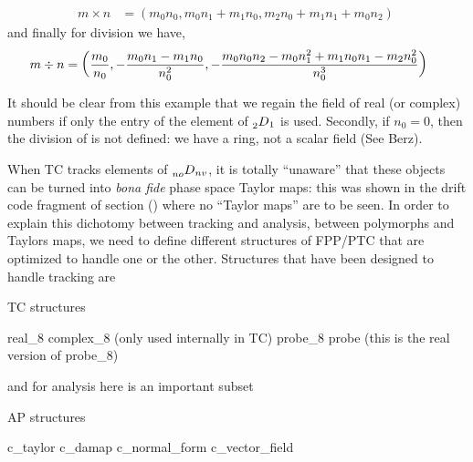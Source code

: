 \documentclass{hitec}     %
\begin{document}
{{{%
\begin{align}m\times n&=\left({{m}_{0}{n}_{0},{m}_{0}{n}_{1}+{m}_{1}{n}_{0},{m}_{2}{n}_{0}+{m}_{1}{n}_{1}+{m}_{0}{n}_{2}}\right)\ \label{eq:nodnvpmul}\end{align}
and finally for division we have,
%
\begin{align}m\div n&=\left({{{m}_{0} \over {n}_{0}},-{{m}_{0}{n}_{1}-{m}_{1}{n}_{0} \over {n}_{0}^{2}},-{{m}_{0}{n}_{0}{n}_{2}-{m}_{0}{n}_{1}^{2}+{m}_{1}{n}_{0}{n}_{1}-{m}_{2}{n}_{0}^{2} \over {n}_{0}^{3}}}\right)\ \label{eq:nodnvpdiv}\end{align}

It should be clear from this example that we regain the field of real (or complex) numbers if only the entry of the element of $\prescript{}{2}{D}_{1}$ is used. Secondly, if $n_0 = 0$, then the division of  is not defined: we have a ring, not a scalar field (See Berz\cite{theberzbook}).


When  TC tracks elements of $ \prescript{}{no}{D}_{nv} $, it is totally ``unaware'' that these objects can be turned into {\it bona fide} phase space Taylor maps: this was shown in the drift code fragment of section () where no ``Taylor maps'' are to be seen. In  
order to explain this dichotomy between tracking and analysis, between polymorphs and Taylors maps, we need to  define  different structures of FPP/PTC that
are optimized to handle one or the other. 
Structures that have been designed to handle tracking are
\begin{code}
TC structures

real_8
complex_8    (only used internally in TC)
probe_8
probe    (this is the real version of probe_8)
\end{code}

and for analysis here is an important subset  

\begin{code}
AP structures

c_taylor
c_damap
c_normal_form
c_vector_field
\end{code}

}}}
\end{document}
